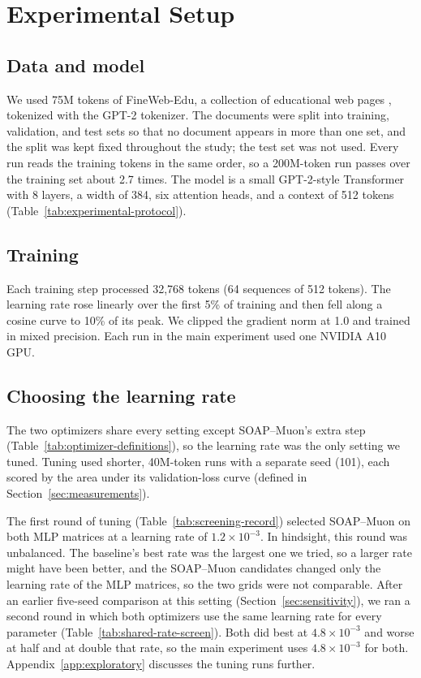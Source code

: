 \section{Experimental Setup}
\label{sec:protocol}

\subsection{Data and model}

We used 75M tokens of FineWeb-Edu, a collection of educational web pages
\cite{penedo2024fineweb}, tokenized with the GPT-2 tokenizer. The documents were
split into training, validation, and test sets so that no document appears in
more than one set, and the split was kept fixed throughout the study; the test
set was not used. Every run reads the training tokens in the same order, so a
200M-token run passes over the training set about 2.7 times. The model is a
small GPT-2-style Transformer with 8 layers, a width of 384, six attention
heads, and a context of 512 tokens (Table~\ref{tab:experimental-protocol}).

\subsection{Training}

Each training step processed 32,768 tokens (64 sequences of 512 tokens). The
learning rate rose linearly over the first 5\% of training and then fell along a
cosine curve to 10\% of its peak. We clipped the gradient norm at 1.0 and
trained in mixed precision. Each run in the main experiment used one NVIDIA A10
GPU.



\subsection{Choosing the learning rate}
\label{sec:selection}

The two optimizers share every setting except SOAP--Muon's extra step
(Table~\ref{tab:optimizer-definitions}), so the learning rate was the only
setting we tuned. Tuning used shorter, 40M-token runs with a separate seed
(101), each scored by the area under its validation-loss curve (defined in
Section~\ref{sec:measurements}).

The first round of tuning (Table~\ref{tab:screening-record}) selected
SOAP--Muon on both MLP matrices at a learning rate of $1.2\times10^{-3}$. In
hindsight, this round was unbalanced. The baseline's best rate was the largest
one we tried, so a larger rate might have been better, and the SOAP--Muon
candidates changed only the learning rate of the MLP matrices, so the two grids
were not comparable. After an earlier five-seed comparison at this setting
(Section~\ref{sec:sensitivity}), we ran a second round in which both optimizers
use the same learning rate for every parameter
(Table~\ref{tab:shared-rate-screen}). Both did best at $4.8\times10^{-3}$ and
worse at half and at double that rate, so the main experiment uses
$4.8\times10^{-3}$ for both. Appendix~\ref{app:exploratory} discusses the
tuning runs further.

